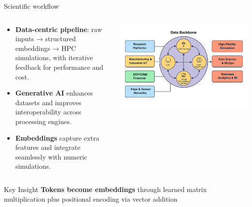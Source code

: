 \documentclass[aspectratio=169]{beamer}
\begin{document}
\begin{frame}{Scientific workflow}
    \begin{columns}
        \begin{column}{0.6\textwidth}
            \begin{itemize}
                \item \textbf{Data-centric pipeline}: raw inputs → structured embeddings → HPC simulations, with iterative feedback for performance and cost.  
                \item \textbf{Generative AI} enhances datasets and improves interoperability across processing engines.  
                \item \textbf{Embeddings} capture extra features and integrate seamlessly with numeric simulations.  
            \end{itemize}
        \end{column}
        \begin{column}{0.4\textwidth}
            \includegraphics[width=\textwidth,height=0.6\textheight,keepaspectratio]{../../images/DataCentric-DataBackbone-Strategy.png}
        \end{column}
    \end{columns}
    
    \vspace{0.3cm}
    \begin{block}{Key Insight}
        \textbf {Tokens become embeddings} through learned matrix multiplication plus positional encoding via vector addition
    \end{block}
\end{frame}
\end{document}

